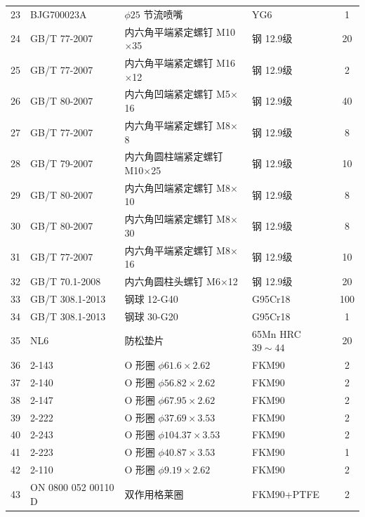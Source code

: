 \begin{table}[htbp]
\begin{tabular}{clllc}
        23 & BJG700023A & $\phi 25$ 节流喷嘴 & YG6 & 1 \\
        24 & GB/T 77-2007 & 内六角平端紧定螺钉 M10$\times$35 & 钢 12.9级 & 20 \\
        25 & GB/T 77-2007 & 内六角平端紧定螺钉 M16$\times$12 & 钢 12.9级 & 2 \\
        26 & GB/T 80-2007 & 内六角凹端紧定螺钉 M5$\times$16 & 钢 12.9级 & 40 \\
        27 & GB/T 77-2007 & 内六角平端紧定螺钉 M8$\times$8 & 钢 12.9级 & 8 \\
        28 & GB/T 79-2007 & 内六角圆柱端紧定螺钉 M10$\times$25 & 钢 12.9级 & 10 \\
        29 & GB/T 80-2007 & 内六角凹端紧定螺钉 M8$\times$10 & 钢 12.9级 & 8 \\
        30 & GB/T 80-2007 & 内六角凹端紧定螺钉 M8$\times$30 & 钢 12.9级 & 8 \\
        31 & GB/T 77-2007 & 内六角平端紧定螺钉 M8$\times$16 & 钢 12.9级 & 10 \\
        32 & GB/T 70.1-2008 & 内六角圆柱头螺钉 M6$\times$12 & 钢 12.9级 & 20 \\
        33 & GB/T 308.1-2013 & 钢球 12-G40 & G95Cr18 & 100 \\
        34 & GB/T 308.1-2013 & 钢球 30-G20 & G95Cr18 & 1 \\
        35 & NL6 & 防松垫片 & 65Mn HRC$39\sim44$ & 20 \\
        36 & 2-143 & O 形圈 $\phi 61.6\times2.62$ & FKM90 & 2 \\
        37 & 2-140 & O 形圈 $\phi 56.82\times2.62$ & FKM90 & 2 \\
        38 & 2-147 & O 形圈 $\phi 67.95\times2.62$ & FKM90 & 2 \\
        39 & 2-222 & O 形圈 $\phi 37.69\times3.53$ & FKM90 & 2 \\
        40 & 2-243 & O 形圈 $\phi 104.37\times3.53$ & FKM90 & 2 \\
        41 & 2-223 & O 形圈 $\phi 40.87\times3.53$ & FKM90 & 1 \\
        42 & 2-110 & O 形圈 $\phi 9.19\times2.62$ & FKM90 & 2 \\
        43 & ON 0800 052 00110 D & 双作用格莱圈 & FKM90+PTFE & 2 \\
        \bottomrule
    \end{tabular}
\end{table}

